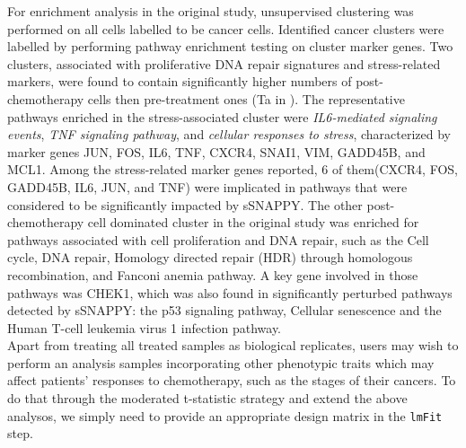 \documentclass[9pt,a4paper,]{extarticle}
\begin{document}
For enrichment analysis in the original study\citep{Zhang2022}, unsupervised clustering was performed on all cells labelled to be cancer cells.
Identified cancer clusters were labelled by performing pathway enrichment testing on cluster marker genes.
Two clusters, associated with proliferative DNA repair signatures and stress-related markers, were found to contain significantly higher numbers of post-chemotherapy cells then pre-treatment ones (Ta in \citep{Zhang2022}).
The representative pathways enriched in the stress-associated cluster were \emph{IL6-mediated signaling events}, \emph{TNF signaling pathway}, and \emph{cellular responses to stress}, characterized by marker genes JUN, FOS, IL6, TNF, CXCR4, SNAI1, VIM, GADD45B, and MCL1.
Among the stress-related marker genes reported, 6 of them(CXCR4, FOS, GADD45B, IL6, JUN, and TNF) were implicated in pathways that were considered to be significantly impacted by sSNAPPY.
The other post-chemotherapy cell dominated cluster in the original study was enriched for pathways associated with cell proliferation and DNA repair, such as the Cell cycle, DNA repair, Homology directed repair (HDR) through homologous recombination, and Fanconi anemia pathway.
A key gene involved in those pathways was CHEK1, which was also found in significantly perturbed pathways detected by sSNAPPY: the p53 signaling pathway, Cellular senescence and the Human T-cell leukemia virus 1 infection pathway.\\

Apart from treating all treated samples as biological replicates, users may wish to perform an analysis samples incorporating other phenotypic traits which may affect patients' responses to chemotherapy, such as the stages of their cancers.
To do that through the moderated t-statistic strategy and extend the above analysos, we simply need to provide an appropriate design matrix in the \texttt{lmFit} step.
\end{document}
